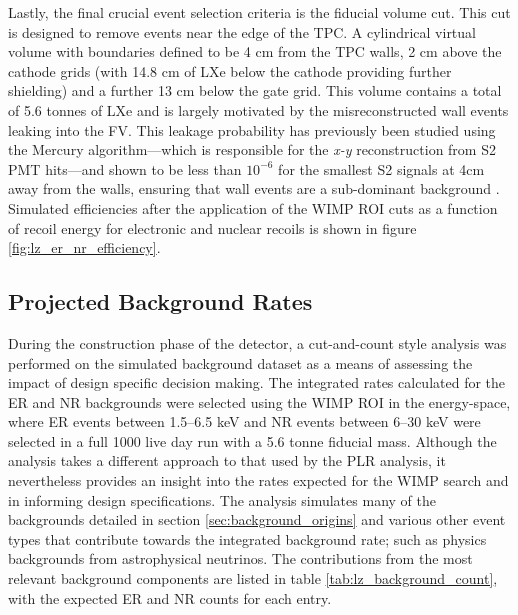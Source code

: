 Lastly, the final crucial event selection criteria is the fiducial volume cut. This cut is designed to remove events near the edge of the TPC. A cylindrical virtual volume with boundaries defined to be 4 cm from the TPC walls, 2 cm above the cathode grids (with 14.8 cm of LXe below the cathode providing further shielding) and a further 13 cm below the gate grid. This volume contains a total of 5.6 tonnes of LXe and is largely motivated by the misreconstructed wall events leaking into the FV. This leakage probability has previously been studied using the Mercury algorithm---which is responsible for the \textit{x-y} reconstruction from S2 PMT hits---and shown to be less than $10^{-6}$ for the smallest S2 signals at 4cm away from the walls, ensuring that wall events are a sub-dominant background \cite{Solovov_2012, Akerib_2018_lux_mercury}. Simulated efficiencies after the application of the WIMP ROI cuts as a function of recoil energy for electronic and nuclear recoils is shown in figure \ref{fig:lz_er_nr_efficiency}.


\subsection{Projected Background Rates}
\label{secsec:background_table}

During the construction phase of the detector, a cut-and-count style analysis was performed on the simulated background dataset as a means of assessing the impact of design specific decision making. The integrated rates calculated for the ER and NR backgrounds were selected using the WIMP ROI in the energy-space, where ER events between 1.5–6.5 keV and NR events between 6–30 keV were selected in a full 1000 live day run with a 5.6 tonne fiducial mass. Although the analysis takes a different approach to that used by the PLR analysis, it nevertheless provides an insight into the rates expected for the WIMP search and in informing design specifications. The analysis simulates many of the backgrounds detailed in section \ref{sec:background_origins} and various other event types that contribute towards the integrated background rate; such as physics backgrounds from astrophysical neutrinos. The contributions from the most relevant background components are listed in table \ref{tab:lz_background_count}, with the expected ER and NR counts for each entry. 

